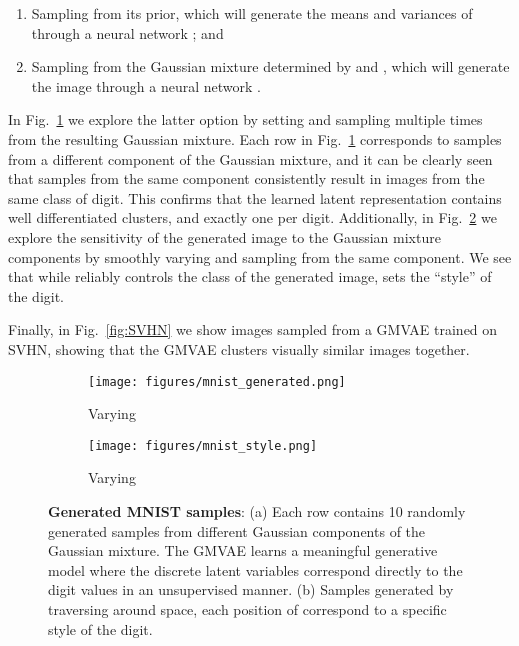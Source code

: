 \documentclass{article} \usepackage{iclr2017_conference,times}
\begin{document}
\begin{enumerate}
\item Sampling  from its prior, which will generate the means and variances of  through a neural network ; and
\item Sampling  from the Gaussian mixture determined by  and , which will generate the image through a neural network .
\end{enumerate}

In Fig.~\ref{fig:mnist_gen} we explore the latter option by setting  and sampling multiple times from the resulting Gaussian mixture. Each row in Fig.~\ref{fig:mnist_gen} corresponds to samples from a different component of the Gaussian mixture, and it can be clearly seen that samples from the same component consistently result in images from the same class of digit. This confirms that the learned latent representation contains well differentiated clusters, and exactly one per digit. Additionally, in Fig.~\ref{fig:mnist_style} we explore the sensitivity of the generated image to the Gaussian mixture components by smoothly varying  and sampling from the same component. We see that while  reliably controls the class of the generated image,  sets the ``style'' of the digit.

Finally, in Fig.~\ref{fig:SVHN} we show images sampled from a GMVAE trained on SVHN, showing that the GMVAE clusters visually similar images together.

\begin{figure}[h]
\centering
	\begin{subfigure}{.5\textwidth}
		\centering
		\texttt{[image: figures/mnist\_generated.png]}
		\caption{Varying }
        \label{fig:mnist_gen}
	\end{subfigure}\begin{subfigure}{.5\textwidth}
		\centering
		\texttt{[image: figures/mnist\_style.png]}
		\caption{Varying }
        \label{fig:mnist_style}
	\end{subfigure}
\caption{\textbf{Generated MNIST samples}: (a) Each row contains 10 randomly generated samples from different Gaussian components of the Gaussian mixture. The GMVAE learns a meaningful generative model where the discrete latent variables  correspond directly to the digit values in an unsupervised manner. (b) Samples generated by traversing around  space, each position of  correspond to a specific style of the digit.}
\label{fig:mnist}
\end{figure}
\end{document}

